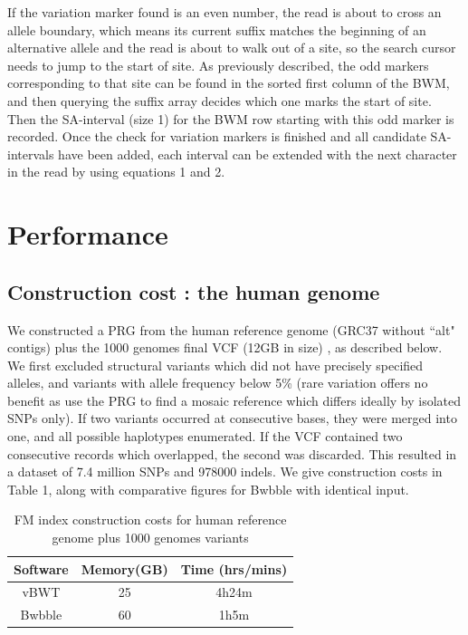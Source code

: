 \documentclass[runningheads,a4paper]{llncs}
\begin{document}
If the variation marker found is an even number, the read is about to cross an allele boundary, which means its current suffix matches the beginning of an alternative allele and the read is about to walk out of a site, so the search cursor needs to jump to the start of site. As previously described, the odd markers corresponding to that site can be found in the sorted first column of the BWM, and then querying the suffix array decides which one marks the start of site. Then the SA-interval (size 1) for the BWM row starting with this odd marker is recorded.
Once the check for variation markers is finished and all candidate SA-intervals have been added, each interval can be extended with the next character in the read by using equations 1 and 2.




\section{Performance}
\subsection{Construction cost : the human genome}
We   constructed a PRG from the human reference genome (GRC37 without ``alt" contigs) plus the 1000 genomes final VCF (12GB in size) \cite{1000g}, as described below. We first  excluded structural variants which did not have precisely specified alleles, and variants with allele frequency below 5\% (rare variation offers no benefit as use the PRG to find a mosaic reference which differs ideally by isolated SNPs only). If two variants occurred at consecutive bases, they were merged into one, and all possible haplotypes enumerated. If the VCF contained two consecutive records which overlapped, the second was discarded. This resulted in a dataset of 7.4 million SNPs and 978000 indels. We give construction costs in Table 1, along with comparative figures for Bwbble with identical input. 
 
\begin{table}
\caption{FM index construction costs for human reference genome plus 1000 genomes variants}
\centering
\begin{tabular}{c c c}
\hline
Software  & Memory(GB) & Time (hrs/mins)\\
\hline
vBWT  & 25  & 4h24m \\
Bwbble  & 60 &  1h5m \\ 
\hline
\end{tabular}
\end{table}
\end{document}
